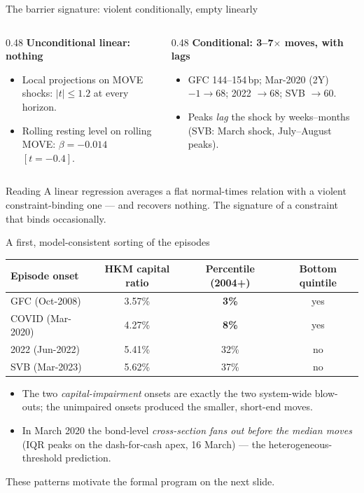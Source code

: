 \documentclass[aspectratio=169]{beamer}
\newcommand{\bps}{\,bp}
\begin{document}
\begin{frame}{The barrier signature: violent conditionally, empty linearly}
\begin{columns}[T]
\begin{column}{0.48\textwidth}
\textbf{Unconditional linear: nothing}
\begin{itemize}
  \item Local projections on MOVE shocks: $|t|\le1.2$ at every horizon.
  \item Rolling resting level on rolling MOVE: $\beta=-0.014$ $[t=-0.4]$.
\end{itemize}
\end{column}
\begin{column}{0.48\textwidth}
\textbf{Conditional: 3--7$\times$ moves, with lags}
\begin{itemize}
  \item GFC 144--154\bps; Mar-2020 (2Y) $-1\to68$; 2022 $\to68$; SVB $\to60$.
  \item Peaks \emph{lag} the shock by weeks--months (SVB: March shock, July--August peaks).
\end{itemize}
\end{column}
\end{columns}
\vspace{0.7em}
\begin{alertblock}{Reading}
A linear regression averages a flat normal-times relation with a violent
constraint-binding one --- and recovers nothing. The signature of a constraint that
binds occasionally.
\end{alertblock}
\end{frame}

\begin{frame}{A first, model-consistent sorting of the episodes}
\begin{center}\small
\begin{tabular}{lccc}
\toprule
Episode onset & HKM capital ratio & Percentile (2004+) & Bottom quintile \\
\midrule
GFC (Oct-2008) & 3.57\% & \textbf{3\%} & yes \\
COVID (Mar-2020) & 4.27\% & \textbf{8\%} & yes \\
2022 (Jun-2022) & 5.41\% & 32\% & no \\
SVB (Mar-2023) & 5.62\% & 37\% & no \\
\bottomrule
\end{tabular}
\end{center}
\vspace{0.5em}
\begin{itemize}
  \item The two \emph{capital-impairment} onsets are exactly the two system-wide blow-outs;
        the unimpaired onsets produced the smaller, short-end moves.
  \item In March 2020 the bond-level \emph{cross-section fans out before the median moves}
        (IQR peaks on the dash-for-cash apex, 16 March) --- the heterogeneous-threshold
        prediction.
\end{itemize}
\vspace{0.2em}
{\small These patterns motivate the formal program on the next slide.}
\end{frame}
\end{document}
